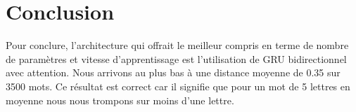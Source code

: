 \section{Conclusion}

Pour conclure, l'architecture qui offrait le meilleur compris en terme de nombre de paramètres et vitesse d'apprentissage est l'utilisation de GRU bidirectionnel avec attention. Nous arrivons au plus bas à une distance moyenne de 0.35 sur 3500 mots. Ce résultat est correct car il signifie que pour un mot de 5 lettres en moyenne nous nous trompons sur moins d'une lettre.